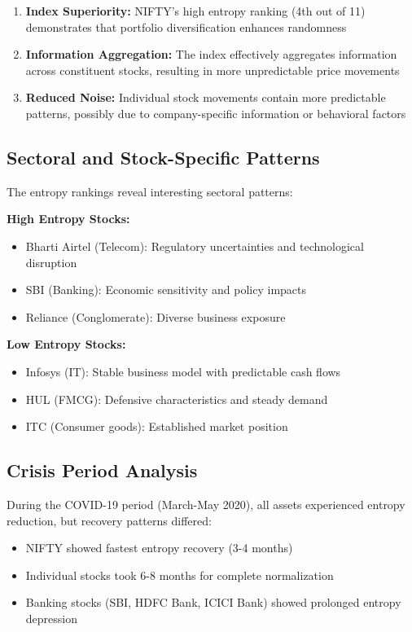\documentclass[12pt,a4paper]{article}
\begin{document}
\begin{enumerate}
    \item \textbf{Index Superiority:} NIFTY's high entropy ranking (4th out of 11) demonstrates that portfolio diversification enhances randomness
    \item \textbf{Information Aggregation:} The index effectively aggregates information across constituent stocks, resulting in more unpredictable price movements
    \item \textbf{Reduced Noise:} Individual stock movements contain more predictable patterns, possibly due to company-specific information or behavioral factors
\end{enumerate}

\subsection{Sectoral and Stock-Specific Patterns}

The entropy rankings reveal interesting sectoral patterns:

\textbf{High Entropy Stocks:}
\begin{itemize}
    \item Bharti Airtel (Telecom): Regulatory uncertainties and technological disruption
    \item SBI (Banking): Economic sensitivity and policy impacts
    \item Reliance (Conglomerate): Diverse business exposure
\end{itemize}

\textbf{Low Entropy Stocks:}
\begin{itemize}
    \item Infosys (IT): Stable business model with predictable cash flows
    \item HUL (FMCG): Defensive characteristics and steady demand
    \item ITC (Consumer goods): Established market position
\end{itemize}

\subsection{Crisis Period Analysis}

During the COVID-19 period (March-May 2020), all assets experienced entropy reduction, but recovery patterns differed:

\begin{itemize}
    \item NIFTY showed fastest entropy recovery (3-4 months)
    \item Individual stocks took 6-8 months for complete normalization  
    \item Banking stocks (SBI, HDFC Bank, ICICI Bank) showed prolonged entropy depression
\end{itemize}
\end{document}
